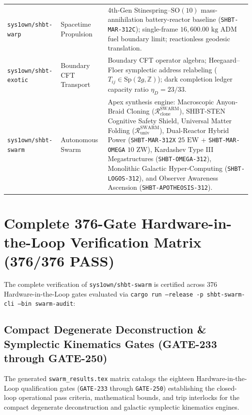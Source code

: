 \documentclass[11pt,onecolumn]{article}
\begin{document}
\begin{table}[!htbp]
{\begin{tabularx}{\linewidth}{@{}p{3.6cm} p{3.0cm} X@{}}
\addlinespace
\texttt{sys1own/shbt-warp} & Spacetime Propulsion & 4th-Gen Stinespring--$\text{SO}(10)$ mass-annihilation battery-reactor baseline (\texttt{SHBT-MAR-312C}); single-frame $16{,}600.00\text{ kg}$ ADM fuel boundary limit; reactionless geodesic translation. \\
\addlinespace
\texttt{sys1own/shbt-exotic} & Boundary CFT Transport & Boundary CFT operator algebra; Heegaard--Floer symplectic address relabeling ($T_{ij} \in \text{Sp}(2g, \mathbb{Z})$); dark completion ledger capacity ratio $\eta_D = 23/33$. \\
\addlinespace
\texttt{sys1own/shbt-swarm} & Autonomous Swarm & Apex synthesis engine: Macroscopic Anyon-Braid Cloning ($\mathcal{R}_{\text{clone}}^{\text{SWARM}}$), SHBT-STEN Cognitive Safety Shield, Universal Matter Folding ($\mathcal{R}_{\text{univ}}^{\text{SWARM}}$), Dual-Reactor Hybrid Power (\texttt{SHBT-MAR-312X} $25\text{ EW}$ + \texttt{SHBT-MAR-OMEGA} $10\text{ ZW}$), Kardashev Type III Megastructures (\texttt{SHBT-OMEGA-312}), Monolithic Galactic Hyper-Computing (\texttt{SHBT-LOGOS-312}), and Observer Awareness Ascension (\texttt{SHBT-APOTHEOSIS-312}). \\
\bottomrule
\end{tabularx}%
}
\end{table}
\FloatBarrier
\appendix
\section{Complete 376-Gate Hardware-in-the-Loop Verification Matrix (376/376 PASS)}
\label{sec:hil_matrix_320}
The complete verification of \texttt{sys1own/shbt-swarm} is certified across 376 Hardware-in-the-Loop gates evaluated via \texttt{cargo run --release -p shbt-swarm-cli --bin swarm-audit}:

\FloatBarrier

\FloatBarrier

\subsection{Compact Degenerate Deconstruction \& Symplectic Kinematics Gates (GATE-233 through GATE-250)}
\label{subsec:gate_233_250_table}
The generated \texttt{swarm\_results.tex} matrix catalogs the eighteen Hardware-in-the-Loop qualification gates (\texttt{GATE-233} through \texttt{GATE-250}) establishing the closed-loop operational pass criteria, mathematical bounds, and trip interlocks for the compact degenerate deconstruction and galactic symplectic kinematics engines.
\end{document}
